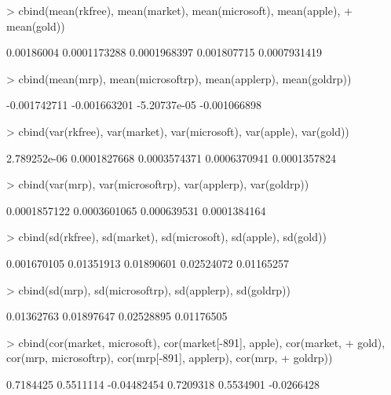 \documentclass[12pt, a14paper, lithuanian]{article}
\begin{document}
\begin{Schunk}
\begin{Sinput}
> cbind(mean(rkfree), mean(market), mean(microsoft), mean(apple), 
+     mean(gold))
\end{Sinput}
\begin{Soutput}
           [,1]         [,2]         [,3]        [,4]         [,5]
[1,] 0.00186004 0.0001173288 0.0001968397 0.001807715 0.0007931419
\end{Soutput}
\begin{Sinput}
> cbind(mean(mrp), mean(microsoftrp), mean(applerp), mean(goldrp))
\end{Sinput}
\begin{Soutput}
             [,1]         [,2]         [,3]         [,4]
[1,] -0.001742711 -0.001663201 -5.20737e-05 -0.001066898
\end{Soutput}
\begin{Sinput}
> cbind(var(rkfree), var(market), var(microsoft), var(apple), var(gold))
\end{Sinput}
\begin{Soutput}
             [,1]         [,2]         [,3]         [,4]         [,5]
[1,] 2.789252e-06 0.0001827668 0.0003574371 0.0006370941 0.0001357824
\end{Soutput}
\begin{Sinput}
> cbind(var(mrp), var(microsoftrp), var(applerp), var(goldrp))
\end{Sinput}
\begin{Soutput}
             [,1]         [,2]        [,3]         [,4]
[1,] 0.0001857122 0.0003601065 0.000639531 0.0001384164
\end{Soutput}
\begin{Sinput}
> cbind(sd(rkfree), sd(market), sd(microsoft), sd(apple), sd(gold))
\end{Sinput}
\begin{Soutput}
            [,1]       [,2]       [,3]       [,4]       [,5]
[1,] 0.001670105 0.01351913 0.01890601 0.02524072 0.01165257
\end{Soutput}
\begin{Sinput}
> cbind(sd(mrp), sd(microsoftrp), sd(applerp), sd(goldrp))
\end{Sinput}
\begin{Soutput}
           [,1]       [,2]       [,3]       [,4]
[1,] 0.01362763 0.01897647 0.02528895 0.01176505
\end{Soutput}
\begin{Sinput}
> cbind(cor(market, microsoft), cor(market[-891], apple), cor(market, 
+     gold), cor(mrp, microsoftrp), cor(mrp[-891], applerp), cor(mrp, 
+     goldrp))
\end{Sinput}
\begin{Soutput}
          [,1]      [,2]        [,3]      [,4]      [,5]       [,6]
[1,] 0.7184425 0.5511114 -0.04482454 0.7209318 0.5534901 -0.0266428
\end{Soutput}
\end{Schunk}
\end{document}
